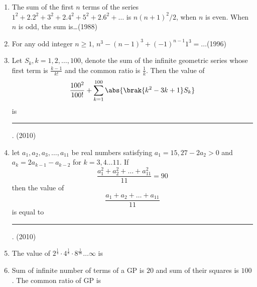 \begin{enumerate}[label=\thesubsection.\arabic*,ref=\thesubsection.\theenumi]
	     \item The sum of the first $n$ terms of the series ${1^2+2.2^2+3^2+2.4^2+5^2+2.6^2+\dots}$ is
   ${n (n+1)^2 /2}$, when $n$ is even. When $n$ is odd, the sum 
   is\dots\hfill{(1988)}

		  \item For any odd integer $n \ge 1$, ${n^3-(n-1)^3+(-1)^{n-1} 1^3=\dots}$\hfill{(1996)}
\item Let $S_{k}, k = 1,2, \dots , 100$, denote the sum of the infinite geometric series whose first term is  $\frac{k - 1}{k!}$ and the common ratio is $\frac{1}{k}$. Then the value of $$\frac{100^{2}}{100!} + \sum\limits_{k=1}^{100} \abs{\brak{k^{2} - 3k +1}S_{k}} $$ is \rule{1cm}{0.1pt}. \hfill(2010)
\item let $a_{1},a_{2},a_{3},\dots , a_{11}$ be real numbers satisfying $a_{1}= 15, 27 - 2a_{2} > 0$ and $a_{k}=2a_{k-1} - a_{k-2}$ for $k=3,4 \dots 11$. If $$\frac{a_{1}^{2} + a_{2}^{2} + \dots +a_{11}^{2}}{11} = 90$$ then the value of $$\frac{a_{1} + a_{2} +\dots +a_{11}}{11}$$ is equal to \rule{1cm}{0.1pt}. \hfill(2010)
\item {The value of $2^{\frac{1}{4}}\cdot 4^{\frac{1}{8}}\cdot 8^{\frac{1}{16}} \ldots \infty$ is}
{\hfill{}} 
\begin{enumerate}
\end{enumerate}
\item {Sum of infinite number of terms of a GP is $20$ and sum of their squares is $100$. The common ratio of GP is}
{\hfill{}} 
\begin{enumerate}
\end{enumerate} 


\end{enumerate}
